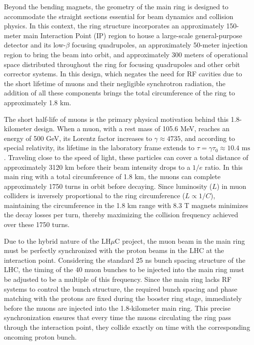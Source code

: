 \documentclass[a4paper,11pt]{article}
\begin{document}
Beyond the bending magnets, the geometry of the main ring is designed to accommodate the straight sections essential for beam dynamics and collision physics. In this context, the ring structure incorporates an approximately 150-meter main Interaction Point (IP) region to house a large-scale general-purpose detector and its low-$\beta$ focusing quadrupoles, an approximately 50-meter injection region to bring the beam into orbit, and approximately 300 meters of operational space distributed throughout the ring for focusing quadrupoles and other orbit corrector systems. In this design, which negates the need for RF cavities due to the short lifetime of muons and their negligible synchrotron radiation, the addition of all these components brings the total circumference of the ring to approximately 1.8 km.

The short half-life of muons is the primary physical motivation behind this 1.8-kilometer design. When a muon, with a rest mass of 105.6 MeV, reaches an energy of 500 GeV, its Lorentz factor increases to $\gamma \approx 4735$, and according to special relativity, its lifetime in the laboratory frame extends to $\tau = \gamma \tau_0 \approx 10.4\text{ ms}$. Traveling close to the speed of light, these particles can cover a total distance of approximately 3120 km before their beam intensity drops to a $1/e$ ratio. In this main ring with a total circumference of 1.8 km, the muons can complete approximately 1750 turns in orbit before decaying. Since luminosity ($L$) in muon colliders is inversely proportional to the ring circumference ($L \propto 1/C$), maintaining the circumference in the 1.8 km range with 8.3 T magnets minimizes the decay losses per turn, thereby maximizing the collision frequency achieved over these 1750 turns.

Due to the hybrid nature of the LH$\mu$C project, the muon beam in the main ring must be perfectly synchronized with the proton beams in the LHC at the interaction point. Considering the standard 25 ns bunch spacing structure of the LHC, the timing of the 40 muon bunches to be injected into the main ring must be adjusted to be a multiple of this frequency. Since the main ring lacks RF systems to control the bunch structure, the required bunch spacing and phase matching with the protons are fixed during the booster ring stage, immediately before the muons are injected into the 1.8-kilometer main ring. This precise synchronization ensures that every time the muons circulating the ring pass through the interaction point, they collide exactly on time with the corresponding oncoming proton bunch.
\end{document}

